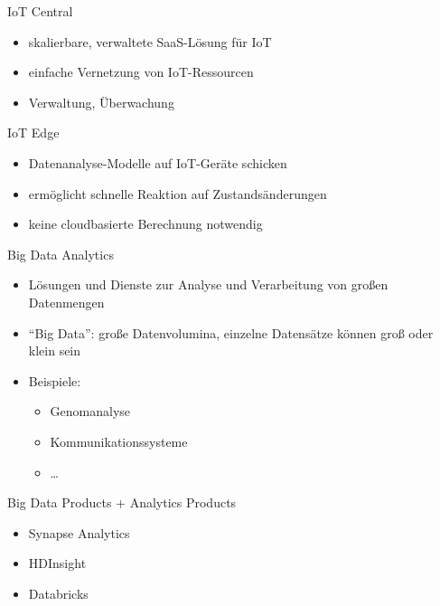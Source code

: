 \begin{flashcard}[Definition]{IoT Central}
    \begin{itemize}
        \item skalierbare, verwaltete SaaS-Lösung für IoT
        \item einfache Vernetzung von IoT-Ressourcen
        \item Verwaltung, Überwachung
    \end{itemize}
\end{flashcard}

\begin{flashcard}[Definition]{IoT Edge}
    \begin{itemize}
        \item Datenanalyse-Modelle auf IoT-Geräte schicken
        \item ermöglicht schnelle Reaktion auf Zustandsänderungen
        \item keine cloudbasierte Berechnung notwendig
    \end{itemize}
\end{flashcard}

\begin{flashcard}[Definition]{Big Data Analytics}
    \begin{itemize}
        \item Lösungen und Dienste zur Analyse und Verarbeitung von großen Datenmengen
        \item ``Big Data'': große Datenvolumina, einzelne Datensätze können groß oder klein sein
        \item Beispiele:
            \begin{itemize}
                \item Genomanalyse
                \item Kommunikationssysteme
                \item \ldots
            \end{itemize}
    \end{itemize}
\end{flashcard}

\begin{flashcard}[Describe]{Big Data Products + Analytics Products}
    \begin{itemize}
        \item Synapse Analytics
        \item HDInsight
        \item Databricks
    \end{itemize}

\end{flashcard}


